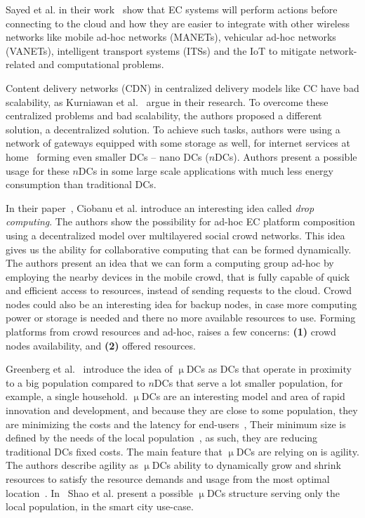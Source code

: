 Sayed et al. in their work~\cite{El-SayedSPPGML18} show that EC systems will perform actions before connecting to the cloud and how they are easier to integrate with other wireless networks like mobile ad-hoc networks (MANETs), vehicular ad-hoc networks (VANETs), intelligent transport systems (ITSs) and the IoT to mitigate network-related and computational problems.

Content delivery networks (CDN) in centralized delivery models like CC have bad scalability, as Kurniawan et al.~\cite{inbookKurniawan} argue in their research. To overcome these centralized problems and bad scalability, the authors proposed a different solution, a decentralized solution. To achieve such tasks, authors were using a network of gateways equipped with some storage as well, for internet services at home~\cite{inbookKurniawan} forming even smaller DCs -- nano DCs ($n$DCs). Authors present a possible usage for these $n$DCs in some large scale applications with much less energy consumption than traditional DCs.

In their paper~\cite{CiobanuNPDMM19}, Ciobanu et al. introduce an interesting idea called \textit{drop computing}. The authors show the possibility for ad-hoc EC platform composition using a decentralized model over multilayered social crowd networks. This idea gives us the ability for collaborative computing that can be formed dynamically. The authors present an idea that we can form a computing group ad-hoc by employing the nearby devices in the mobile crowd, that is fully capable of quick and efficient access to resources, instead of sending requests to the cloud. Crowd nodes could also be an interesting idea for backup nodes, in case more computing power or storage is needed and there no more available resources to use. Forming platforms from crowd resources and ad-hoc, raises a few concerns: \textbf{(1)} crowd nodes availability, and \textbf{(2)} offered resources. 

Greenberg et al.~\cite{GreenbergHMP09} introduce the idea of $\upmu$DCs as DCs that operate in proximity to a big population compared to $n$DCs that serve a lot smaller population, for example, a single household. $\upmu$DCs are an interesting model and area of rapid innovation and development, and because they are close to some population, they are minimizing the costs and the latency for end-users~\cite{GreenbergHMP09}, Their minimum size is defined by the needs of the local population~\cite{GreenbergHMP09, AbbasZTS18}, as such, they are reducing traditional DCs fixed costs. The main feature that $\upmu$DCs are relying on is agility. The authors describe agility as $\upmu$DCs ability to dynamically grow and shrink resources to satisfy the resource demands and usage from the most optimal location~\cite{GreenbergHMP09}. In~\cite{ShaoLFJL19} Shao et al. present a possible $\upmu$DCs structure serving only the local population, in the smart city use-case.
%
%
